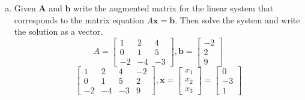 \begin{enumerate}[(a)]
$$\begin{array}{ccc|c}
        \end{array}\right]\leadsto
        \left[\begin{array}{ccc|c}
        1 & 0 & 5 & 2\\
        0 & 1 & 4 & 3\\
        0 & 0 & 0 & 0
        \end{array}\right]
        $$
        Therefore,
        $$
        (2 - 5c)\begin{bmatrix}1 \\ -2 \\ 0\end{bmatrix} + (3 - 4c)\begin{bmatrix}0 \\ 1 \\ 2 \end{bmatrix} + c\begin{bmatrix}5 \\ -6 \\ 8\end{bmatrix} = \begin{bmatrix}2 \\ -1 \\ 6\end{bmatrix}.
        $$
        \begin{remark}
        Review this question after learning Linear Independence and see how this problem is connected with the definition of linear dependence.
        \end{remark}
    \item Given $\mathbf{A}$ and $\mathbf{b}$ write the augmented matrix for the linear system that corresponds to the matrix equation $A \mathbf{x}=\mathbf{b}$. Then solve the system and write the solution as a vector.
    $$A=\left[\begin{array}{rrr}1 & 2 & 4 \\ 0 & 1 & 5 \\ -2 & -4 & -3\end{array}\right], \mathbf{b}=\left[\begin{array}{r}-2 \\ 2 \\ 9\end{array}\right]$$
    $$\left[\begin{array}{rrr|r}1 & 2 & 4 & -2 \\ 0 & 1 & 5 & 2 \\ -2 & -4 & -3 & 9\end{array}\right], \mathbf{x}=\left[\begin{array}{c}x_{1} \\ x_{2} \\ x_{3}\end{array}\right]=\left[\begin{array}{r}0 \\ -3 \\ 1\end{array}\right]$$

\end{enumerate}
